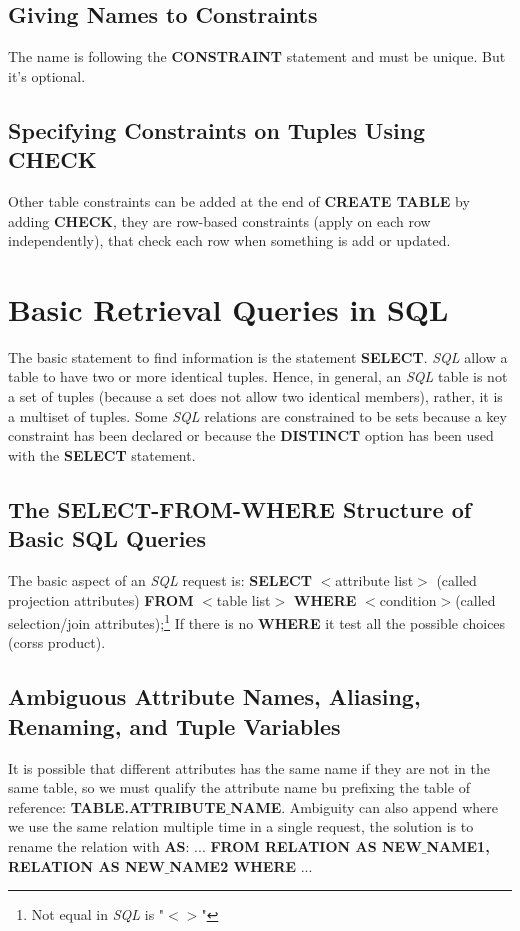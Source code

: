 \subsection{Giving Names to Constraints}
The name is following the \textbf{CONSTRAINT} statement and must be unique. But it's optional.
\subsection{Specifying Constraints on Tuples Using CHECK}
Other table constraints can be added at the end of \textbf{CREATE TABLE} by adding \textbf{CHECK}, they are row-based constraints (apply on each row independently), that check each row when something is add or updated.
\section{Basic Retrieval Queries in SQL}
The basic statement to find information is the statement \textbf{SELECT}.
\textit{SQL} allow a table to have two or more identical tuples. Hence, in general, an \textit{SQL} table is not a set of tuples (because a set does not allow two identical members), rather, it is a multiset of tuples. Some \textit{SQL} relations are constrained to be sets because a key constraint has been declared or because the \textbf{DISTINCT} option has been used with the \textbf{SELECT} statement.
\subsection{The SELECT-FROM-WHERE Structure of Basic SQL Queries}
The basic aspect of an \textit{SQL} request is: \textbf{SELECT} $<$attribute list$>$ (called projection attributes) \textbf{FROM} $<$table list$>$ \textbf{WHERE} $<$condition$>$(called selection/join attributes);\footnote{Not equal in \textit{SQL} is "$<>$"} If there is no \textbf{WHERE} it test all the possible choices (corss product). 
\subsection{Ambiguous Attribute Names, Aliasing, Renaming, and Tuple Variables}
It is possible that different attributes has the same name if they are not in the same table, so we must qualify the attribute name bu prefixing the table of reference: \textbf{TABLE.ATTRIBUTE$\_$NAME}. Ambiguity can also append where we use the same relation multiple time in a single request, the solution is to rename the relation with \textbf{AS}: ... \textbf{FROM RELATION AS NEW$\_$NAME1, RELATION AS NEW$\_$NAME2 WHERE} ...
